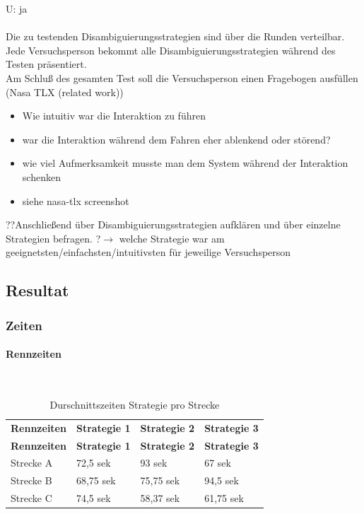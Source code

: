 \documentclass[12pt,a4paper]{scrartcl}
\begin{document}
U: ja
\\
\\
Die zu testenden Disambiguierungsstrategien sind über die Runden verteilbar.\\
Jede Versuchsperson bekommt alle Disambiguierungsstrategien während des Testen präsentiert.\\
Am Schluß des gesamten Test soll die Versuchsperson einen Fragebogen ausfüllen (Nasa TLX (related work))
\begin{itemize}
\item Wie intuitiv war die Interaktion zu führen
\item war die Interaktion während dem Fahren eher ablenkend oder störend?
\item wie viel Aufmerksamkeit musste man dem System während der Interaktion schenken
\item siehe nasa-tlx screenshot
\end{itemize}
??Anschließend über Disambiguierungsstrategien aufklären und über einzelne Strategien befragen.
?$\rightarrow$ welche Strategie war am geeignetsten/einfachsten/intuitivsten für jeweilige Versuchsperson



\subsection{Resultat}
\subsubsection{Zeiten}
\paragraph{Rennzeiten}
~\\
\begin{longtable}{p{3cm}p{3cm}p{3cm}p{3cm} }
	\label{durchschnittsvorl}\\
	\caption[Durschnittszeiten Strategie pro Strecke]{Durschnittszeiten Strategie pro Strecke}\\
	\hline
	\textbf{Rennzeiten}&\textbf{Strategie 1}&\textbf{Strategie 2} &\textbf{Strategie 3}\\
	\hline
	\endfirsthead
	\hline
	\textbf{Rennzeiten}&\textbf{Strategie 1}&\textbf{Strategie 2} &\textbf{Strategie 3}\\
	\hline
	\endhead
Strecke A & 72,5 sek & 93 sek & 67 sek \\
Strecke B & 68,75 sek & 75,75 sek & 94,5 sek \\
Strecke C & 74,5 sek & 58,37 sek & 61,75 sek \\

\hline
\end{longtable}
\end{document}
